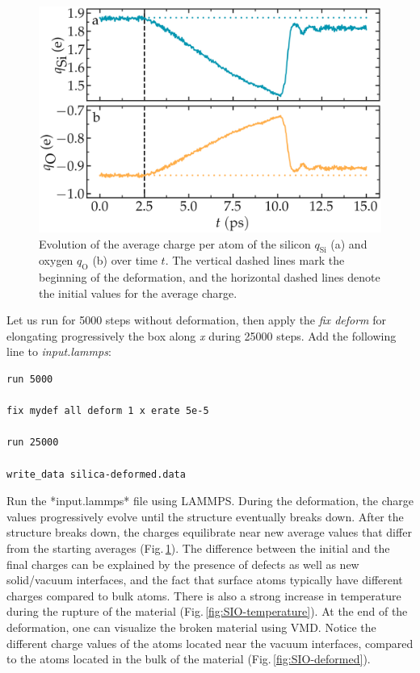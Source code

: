 \documentclass[9pt,tutorial]{livecoms}
\begin{document}
\begin{figure}
\includegraphics[width=\linewidth]{SIO-deformed-charge}
\caption{Evolution of the average charge per atom of the silicon $q_\text{Si}$ (a) and oxygen $q_\text{O}$ (b) over time $t$. The vertical dashed lines mark the beginning of the deformation, and the horizontal dashed lines denote the initial values for the average charge.}
\label{fig:SIO-deformed-charge}
\end{figure}

Let us run for 5000 steps without deformation, then apply the \textit{fix deform} for elongating progressively the box along \textit{x} during 25000 steps. Add the following line to \textit{input.lammps}:
{\normalsize \begin{verbatim}
run 5000

fix mydef all deform 1 x erate 5e-5

run 25000

write_data silica-deformed.data
\end{verbatim}}
Run the *input.lammps* file using LAMMPS. During the deformation, the charge values progressively evolve until the structure eventually breaks down. After the structure breaks down, the charges equilibrate near new average values that differ from the starting averages (Fig.\,\ref{fig:SIO-deformed-charge}). The difference between the initial and the final charges can be explained by the presence of defects as well as new solid/vacuum interfaces, and the fact that surface atoms typically have different charges compared to bulk atoms. There is also a strong increase in temperature during the rupture of the material (Fig.\,\ref{fig:SIO-temperature}). At the end of the deformation, one can visualize the broken material using VMD. Notice the different charge values of the atoms located near the vacuum interfaces, compared to the atoms located in the bulk of the material (Fig.\,\ref{fig:SIO-deformed}).
\end{document}

